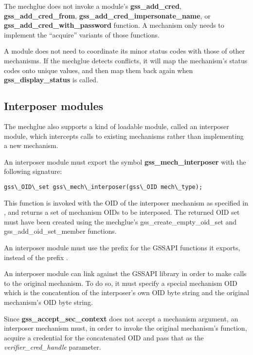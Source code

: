 \documentclass[letterpaper,10pt,english]{sphinxmanual}
\begin{document}
The mechglue does not invoke a module's \textbf{gss\_add\_cred},
\textbf{gss\_add\_cred\_from}, \textbf{gss\_add\_cred\_impersonate\_name}, or
\textbf{gss\_add\_cred\_with\_password} function.  A mechanism only needs to
implement the ``acquire'' variants of those functions.

A module does not need to coordinate its minor status codes with those
of other mechanisms.  If the mechglue detects conflicts, it will map
the mechanism's status codes onto unique values, and then map them
back again when \textbf{gss\_display\_status} is called.


\subsection{Interposer modules}
\label{plugindev/gssapi:interposer-modules}
The mechglue also supports a kind of loadable module, called an
interposer module, which intercepts calls to existing mechanisms
rather than implementing a new mechanism.

An interposer module must export the symbol \textbf{gss\_mech\_interposer}
with the following signature:

\begin{Verbatim}[commandchars=\\\{\}]
gss\_OID\_set gss\_mech\_interposer(gss\_OID mech\_type);
\end{Verbatim}

This function is invoked with the OID of the interposer mechanism as
specified in , and returns a set of mechanism OIDs to
be interposed.  The returned OID set must have been created using the
mechglue's gss\_create\_empty\_oid\_set and gss\_add\_oid\_set\_member
functions.

An interposer module must use the prefix  for the GSSAPI
functions it exports, instead of the prefix .

An interposer module can link against the GSSAPI library in order to
make calls to the original mechanism.  To do so, it must specify a
special mechanism OID which is the concatention of the interposer's
own OID byte string and the original mechanism's OID byte string.

Since \textbf{gss\_accept\_sec\_context} does not accept a mechanism argument,
an interposer mechanism must, in order to invoke the original
mechanism's function, acquire a credential for the concatenated OID
and pass that as the \emph{verifier\_cred\_handle} parameter.
\end{document}
